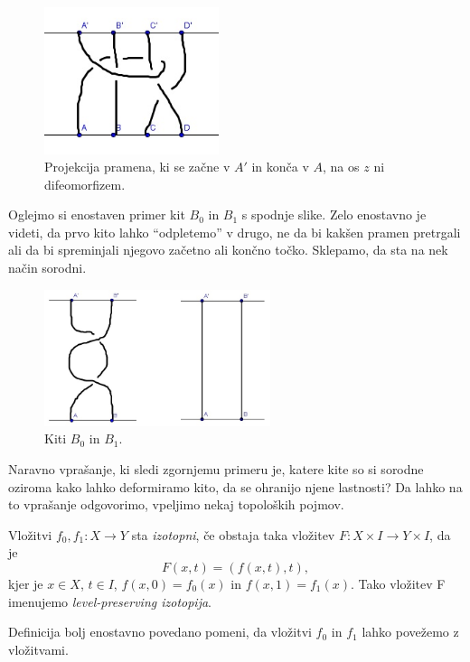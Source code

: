 \documentclass[mat1]{fmfdelo}
\begin{document}
\begin{figure}[h!]
\includegraphics[height = 4.3cm]{ne-kita}
\caption{Projekcija pramena, ki se začne v $A'$ in konča v $A$, na os $z$ ni difeomorfizem.}
\end{figure}

\begin{primer}
Oglejmo si enostaven primer kit $B_0$ in $B_1$ s spodnje slike. Zelo enostavno je videti, da prvo kito lahko ``odpletemo'' v drugo, ne da bi kakšen pramen pretrgali ali da bi spreminjali njegovo začetno ali končno točko. Sklepamo, da sta na nek način sorodni.
\end{primer}

\begin{figure}[h!]
\includegraphics[height = 4cm]{Primer_3}
\caption{Kiti $B_0$ in $B_1$.}
\end{figure}

Naravno vprašanje, ki sledi zgornjemu primeru je, katere kite so si sorodne oziroma kako lahko deformiramo kito, da se ohranijo njene lastnosti? Da lahko na to vprašanje odgovorimo, vpeljimo nekaj topoloških pojmov.

\begin{definicija}
Vložitvi $f_0,f_1: X \rightarrow Y$ sta \emph{izotopni}, če obstaja taka vložitev $F: X \times I \rightarrow Y\times I$, da je
$$F(x, t)=(f(x,t), t),$$ kjer je $x \in X$, $t \in I$, $f(x,0)=f_0(x)$ in $f(x,1)=f_1(x)$. Tako vložitev F imenujemo \emph{level-preserving izotopija}.
\end{definicija}

\begin{opomba}
Definicija bolj enostavno povedano pomeni, da vložitvi $f_0$ in $f_1$ lahko povežemo z vložitvami.
\end{opomba}
\end{document}
